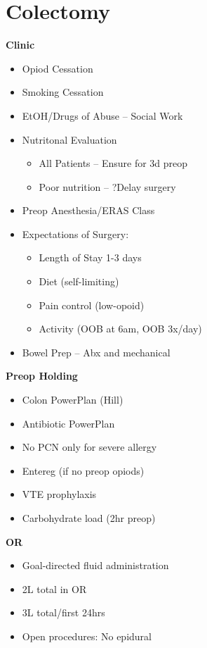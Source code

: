 \documentclass[
]{book}
\providecommand{\tightlist}{%
  \setlength{\itemsep}{0pt}\setlength{\parskip}{0pt}}
\begin{document}
\hypertarget{colectomy}{%
\chapter{Colectomy}\label{colectomy}}

\textbf{Clinic}

\begin{itemize}
\tightlist
\item
  Opiod Cessation
\item
  Smoking Cessation
\item
  EtOH/Drugs of Abuse -- Social Work
\item
  Nutritonal Evaluation

  \begin{itemize}
  \tightlist
  \item
    All Patients -- Ensure for 3d preop
  \item
    Poor nutrition -- ?Delay surgery
  \end{itemize}
\item
  Preop Anesthesia/ERAS Class
\item
  Expectations of Surgery:

  \begin{itemize}
  \tightlist
  \item
    Length of Stay 1-3 days
  \item
    Diet (self-limiting)
  \item
    Pain control (low-opoid)
  \item
    Activity (OOB at 6am, OOB 3x/day)
  \end{itemize}
\item
  Bowel Prep -- Abx and mechanical
\end{itemize}

\textbf{Preop Holding}

\begin{itemize}
\tightlist
\item
  Colon PowerPlan (Hill)
\item
  Antibiotic PowerPlan
\item
  No PCN only for severe allergy
\item
  Entereg (if no preop opiods)
\item
  VTE prophylaxis
\item
  Carbohydrate load (2hr preop)
\end{itemize}

\textbf{OR}

\begin{itemize}
\tightlist
\item
  Goal-directed fluid administration
\item
  2L total in OR
\item
  3L total/first 24hrs
\item
  Open procedures: No epidural
\end{itemize}
\end{document}
